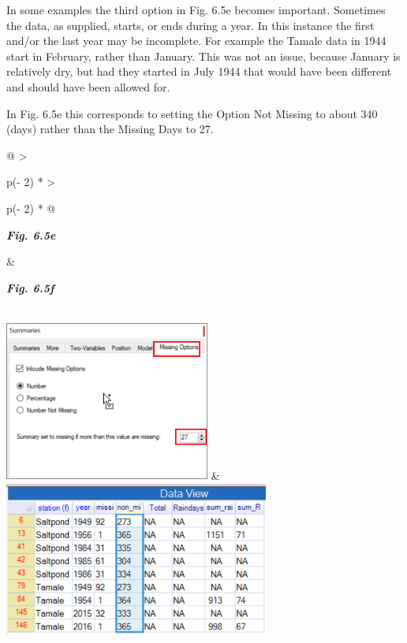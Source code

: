 \documentclass[
  letterpaper,
  DIV=11,
  numbers=noendperiod]{scrreprt}
\begin{document}
In some examples the third option in Fig. 6.5e becomes important.
Sometimes the data, as supplied, starts, or ends during a year. In this
instance the first and/or the last year may be incomplete. For example
the Tamale data in 1944 start in February, rather than January. This was
not an issue, because January is relatively dry, but had they started in
July 1944 that would have been different and should have been allowed
for.

In Fig. 6.5e this corresponds to setting the Option Not Missing to about
340 (days) rather than the Missing Days to 27.

\begin{longtable}[]{@{}
  >{\raggedright\arraybackslash}p{(\columnwidth - 2\tabcolsep) * }
  >{\raggedright\arraybackslash}p{(\columnwidth - 2\tabcolsep) * }@{}}
\toprule\noalign{}
\begin{minipage}[b]{\linewidth}\raggedright
\textbf{\emph{Fig. 6.5e}}
\end{minipage} & \begin{minipage}[b]{\linewidth}\raggedright
\textbf{\emph{Fig. 6.5f}}
\end{minipage} \\
\midrule\noalign{}
\endhead
\bottomrule\noalign{}
\endlastfoot
\includegraphics[width=2.65784in,height=2.08662in]{figures/Fig6.5e.png}
&
\includegraphics[width=3.43017in,height=2.02797in]{figures/Fig6.5f.png} \\
\end{longtable}
\end{document}

